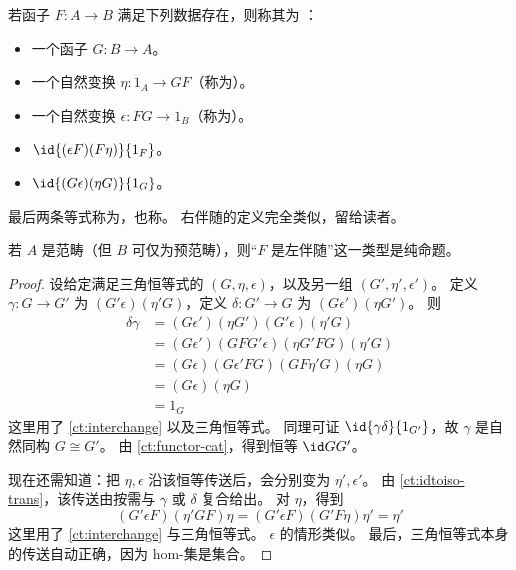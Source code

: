 \begin{defn}\label{ct:adjoints}
  若函子 $F:A\to B$ 满足下列数据存在，则称其为
  ：
  \begin{itemize}
  \item 一个函子 $G:B\to A$。
  \item 一个自然变换 $\eta:1_A \to GF$（称为）。
  \item 一个自然变换 $\epsilon:FG\to 1_B$（称为）。
  \item $\id{(\epsilon F)(F\eta)}{1_F}$。
  \item $\id{(G\epsilon)(\eta G)}{1_G}$。
  \end{itemize}
\end{defn}

最后两条等式称为，也称。
右伴随的定义完全类似，留给读者。

\begin{lem}\label{ct:adjprop}
  若 $A$ 是范畴（但 $B$ 可仅为预范畴），则“$F$ 是左伴随”这一类型是纯命题。
\end{lem}
\begin{proof}
  设给定满足三角恒等式的 $(G,\eta,\epsilon)$，以及另一组 $(G',\eta',\epsilon')$。
  定义 $\gamma:G\to G'$ 为 $(G'\epsilon)(\eta' G)$，定义 $\delta:G'\to G$ 为 $(G\epsilon')(\eta G')$。
  则
  \begin{align*}
    \delta\gamma &=
    (G\epsilon')(\eta G')(G'\epsilon)(\eta'G)\\
    &= (G\epsilon')(G F G'\epsilon)(\eta G' F G)(\eta'G)\\
    &= (G\epsilon)(G\epsilon'FG)(G F \eta' G)(\eta G)\\
    &= (G\epsilon)(\eta G)\\
    &= 1_G
  \end{align*}
  这里用了 \cref{ct:interchange} 以及三角恒等式。
  同理可证 $\id{\gamma\delta}{1_{G'}}$，故 $\gamma$ 是自然同构 $G\cong G'$。
  由 \cref{ct:functor-cat}，得到恒等 $\id G {G'}$。

  现在还需知道：把 $\eta,\epsilon$ 沿该恒等传送后，会分别变为 $\eta',\epsilon'$。
  由 \cref{ct:idtoiso-trans}，该传送由按需与 $\gamma$ 或 $\delta$ 复合给出。
  对 $\eta$，得到
  \begin{equation*}
    (G'\epsilon F)(\eta'GF)\eta
    = (G'\epsilon F)(G'F\eta)\eta'
    = \eta'
  \end{equation*}
  这里用了 \cref{ct:interchange} 与三角恒等式。
  $\epsilon$ 的情形类似。
  最后，三角恒等式本身的传送自动正确，因为 hom-集是集合。
\end{proof}

